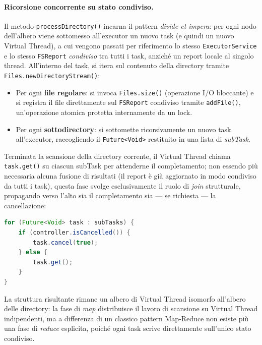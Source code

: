 \documentclass[11pt,a4paper]{article}
\begin{document}
\paragraph{Ricorsione concorrente su stato condiviso.}

Il metodo \texttt{processDirectory()} incarna il pattern \textit{divide et impera}: per ogni nodo dell'albero viene sottomesso all'executor un nuovo task (e quindi un nuovo Virtual Thread), a cui vengono passati per riferimento lo stesso \texttt{ExecutorService} e lo stesso \texttt{FSReport} \textit{condiviso} tra tutti i task, anziché un report locale al singolo thread. All'interno del task, si itera sul contenuto della directory tramite \texttt{Files.newDirectoryStream()}:

\begin{itemize}
    \item Per ogni \textbf{file regolare}: si invoca \texttt{Files.size()} (operazione I/O bloccante) e si registra il file direttamente sul \texttt{FSReport} condiviso tramite \texttt{addFile()}, un'operazione atomica protetta internamente da un lock.
    \item Per ogni \textbf{sottodirectory}: si sottomette ricorsivamente un nuovo task all'executor, raccogliendo il \texttt{Future<Void>} restituito in una lista di \textit{subTask}.
\end{itemize}

Terminata la scansione della directory corrente, il Virtual Thread chiama \texttt{task.get()} su ciascun subTask per attenderne il completamento; non essendo più necessaria alcuna fusione di risultati (il report è già aggiornato in modo condiviso da tutti i task), questa fase svolge esclusivamente il ruolo di \textit{join} strutturale, propagando verso l'alto sia il completamento sia — se richiesta — la cancellazione:

\begin{lstlisting}[language=Java]
for (Future<Void> task : subTasks) {
    if (controller.isCancelled()) {
        task.cancel(true);
    } else {
        task.get();
    }
}
\end{lstlisting}

La struttura risultante rimane un albero di Virtual Thread isomorfo all'albero delle directory: la fase di \textit{map} distribuisce il lavoro di scansione su Virtual Thread indipendenti, ma a differenza di un classico pattern Map-Reduce non esiste più una fase di \textit{reduce} esplicita, poiché ogni task scrive direttamente sull'unico stato condiviso.
\end{document}
